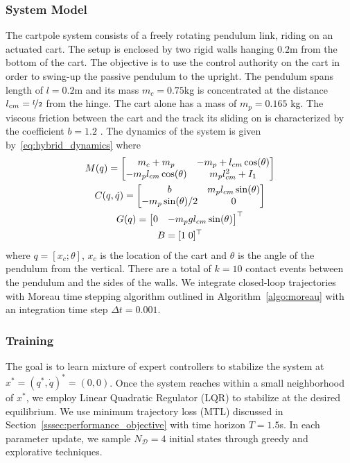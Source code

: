 \subsubsection{System Model}
\label{sssec:cartpole_model}

The cartpole system consists of a freely rotating pendulum link, riding on an
actuated cart.
%
The setup is enclosed by two rigid walls hanging $0.2$m from the bottom of the
cart.
%
The objective is to use the control authority on the cart in order to swing-up
the passive pendulum to the upright.
%
The pendulum spans length of $l=0.2$m and its mass $m_c = 0.75$kg is
concentrated at the distance $l_{cm}=\nicefrac{l}{2}$ from the hinge.
%
The cart alone has a mass of $m_p=0.165$ kg. The viscous friction between the
cart and the track its sliding on is characterized by the coefficient $b=1.2$
.
%
The dynamics of the system
is given by~\eqref{eq:hybrid_dynamics} where 
\begin{equation}
    \begin{gathered}
        M(q) = \begin{bmatrix}m_c + m_p & -m_p+l_{cm} \cos(\theta) \\
        -m_pl_{cm}\cos(\theta) & m_p l_{cm}^2+I_1\end{bmatrix} \\
        C(q, \dot{q}) = \begin{bmatrix}b  & m_pl_{cm}\sin(\theta) \\
                -m_p\sin(\theta)/2 & 0\end{bmatrix} \\
        G(q) = \begin{bmatrix}0 & -m_pg l_{cm} \sin(\theta)\end{bmatrix}^\top \\
        B = [1 \; 0]^\top
    \end{gathered}
\end{equation}
\noindent where $q = [x_c; \theta]$, $x_c$ is the location of the cart and
$\theta$ is the angle of the pendulum from the vertical. 
%
There are a total of $k=10$ contact events between the pendulum and the sides of
the walls.
%
We integrate closed-loop trajectories with Moreau time stepping algorithm
outlined in Algorithm~\eqref{algo:moreau} with an integration time step $\Delta
t=0.001$.
%

\subsubsection{Training}
\label{sssec:cartpole_training}

The goal is to learn mixture of expert controllers to stabilize the system at
$x^* = (q^*, \dot{q})^* = (0, 0)$.
%
Once the system reaches within a small neighborhood of $x^*$, we employ Linear
Quadratic Regulator (LQR) to stabilize at the desired equilibrium.
%
We use minimum trajectory loss (MTL) discussed in
Section~\ref{sssec:performance_objective} with time horizon $T=1.5$s.
%
In each parameter update, we sample $N_{\mathcal{D}}=4$ initial states through
greedy and explorative techniques.
%


